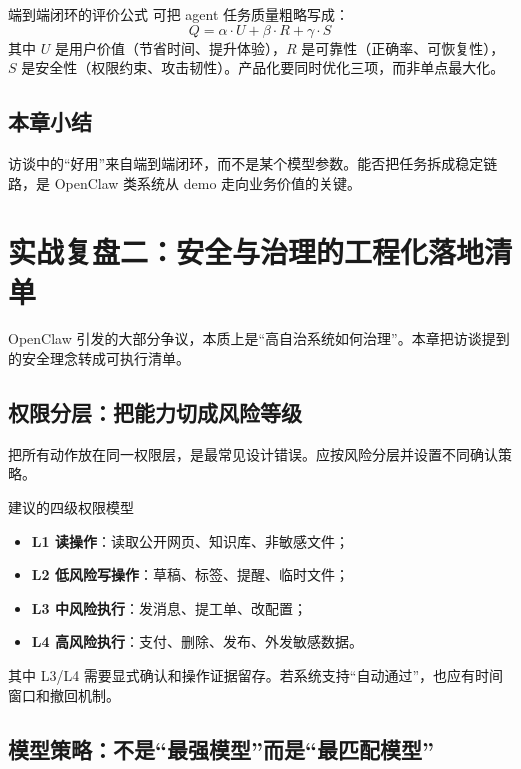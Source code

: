 \documentclass[a4paper]{article}
\begin{document}
\begin{importantbox}{端到端闭环的评价公式}
可把 agent 任务质量粗略写成：
\[
Q = \alpha \cdot U + \beta \cdot R + \gamma \cdot S
\]
其中 \(U\) 是用户价值（节省时间、提升体验），\(R\) 是可靠性（正确率、可恢复性），\(S\) 是安全性（权限约束、攻击韧性）。产品化要同时优化三项，而非单点最大化。
\end{importantbox}

\subsection{本章小结}
访谈中的“好用”来自端到端闭环，而不是某个模型参数。能否把任务拆成稳定链路，是 OpenClaw 类系统从 demo 走向业务价值的关键。

\section{实战复盘二：安全与治理的工程化落地清单}

OpenClaw 引发的大部分争议，本质上是“高自治系统如何治理”。本章把访谈提到的安全理念转成可执行清单。

\subsection{权限分层：把能力切成风险等级}

把所有动作放在同一权限层，是最常见设计错误。应按风险分层并设置不同确认策略。

\begin{knowledgebox}{建议的四级权限模型}
\begin{itemize}
    \item \textbf{L1 读操作}：读取公开网页、知识库、非敏感文件；
    \item \textbf{L2 低风险写操作}：草稿、标签、提醒、临时文件；
    \item \textbf{L3 中风险执行}：发消息、提工单、改配置；
    \item \textbf{L4 高风险执行}：支付、删除、发布、外发敏感数据。
\end{itemize}
\end{knowledgebox}

其中 L3/L4 需要显式确认和操作证据留存。若系统支持“自动通过”，也应有时间窗口和撤回机制。

\subsection{模型策略：不是“最强模型”而是“最匹配模型”}
\end{document}
